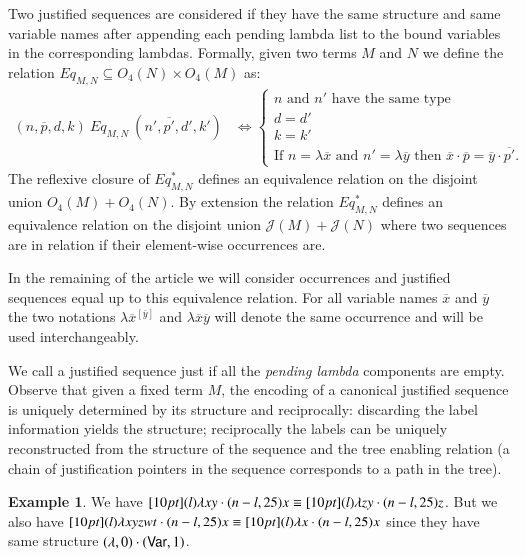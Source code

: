 \documentclass{elsarticle}
\theoremstyle{plain}
\theoremstyle{definition}
\newtheorem{example}{Example}[section]
\theoremstyle{remark}
\def\justseqset{\mathcal{J}}
\begin{document}
Two justified sequences are considered  if they have the same structure and same variable names after appending each pending lambda list to the bound variables in the corresponding lambdas. Formally, given two terms $M$ and $N$ we define the relation
$Eq_{M,N} \subseteq O_4(N) \times O_4(M)$ as:
\begin{align*}
(n,\overline{p},d,k)~Eq_{M,N}~(n',\overline{p'},d',k') &\iff
\begin{cases}
    n \mbox{ and $n'$ have the same type} \\
    d = d' \\
    k = k' \\
    \mbox{If $n=\lambda\overline{x}$ and $n'=\lambda\overline{y}$ then
        $\overline{x} \cdot \overline{p} = \overline{y} \cdot \overline{p'}$.
    }
\end{cases}
\end{align*}
The reflexive closure of $Eq_{M,N}^*$ defines an equivalence relation on
 the disjoint union $O_4(M) + O_4(N)$. By extension the relation $Eq_{M,N}^*$ defines an equivalence relation on the disjoint union $\justseqset(M) + \justseqset(N)$ where two sequences are in relation if their element-wise occurrences are.

In the remaining of the article we will consider occurrences and justified sequences equal up to this equivalence relation. For all variable names $\overline{x}$ and $\overline{y}$ the two notations $\lambda\overline{x}^{[\overline{y}]}$ and $\lambda\overline{x}\overline{y}$ will denote the same occurrence and will be used interchangeably.

We call a justified sequence  just if all the \emph{pending lambda} components are empty. Observe that given a fixed term $M$, the encoding of a canonical justified sequence is uniquely determined by its structure and reciprocally: discarding the label information yields the structure; reciprocally the labels can be uniquely reconstructed from the structure of the sequence and the tree enabling relation (a chain of justification pointers in the sequence corresponds to a path in the tree).

\begin{example}
We have $\Pstr[10pt]{ (l){\lambda x y} \cdot (n-l,25){x} } \equiv \Pstr[10pt]{ (l){\lambda z y} \cdot (n-l,25){z}}$. But we also have $\Pstr[10pt]{ (l){\lambda x y z w t} \cdot (n-l,25){x} } \equiv \Pstr[10pt]{ (l){\lambda x} \cdot (n-l,25){x}}$ since they have same structure $(\lambda,0)\cdot({\sf Var},1)$.
\end{example}
\end{document}

